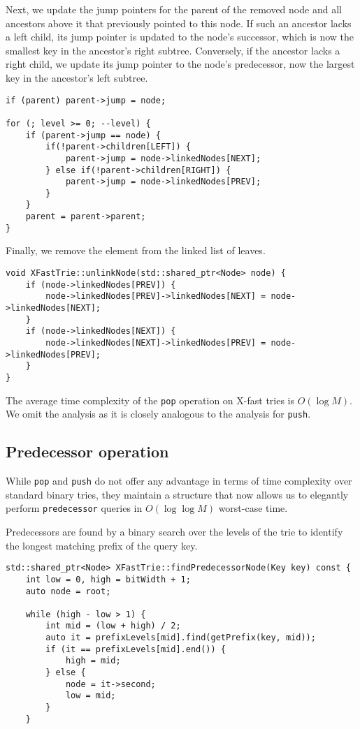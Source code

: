 Next, we update the jump pointers for the parent of the removed node and all ancestors above it that previously pointed to this node. If such an ancestor lacks a left child, its jump pointer is updated to the node’s successor, which is now the smallest key in the ancestor’s right subtree. Conversely, if the ancestor lacks a right child, we update its jump pointer to the node’s predecessor, now the largest key in the ancestor’s left subtree.

\begin{verbatim}
if (parent) parent->jump = node;

for (; level >= 0; --level) {
    if (parent->jump == node) {
        if(!parent->children[LEFT]) {
            parent->jump = node->linkedNodes[NEXT];
        } else if(!parent->children[RIGHT]) {
            parent->jump = node->linkedNodes[PREV];
        }
    }
    parent = parent->parent;
}
\end{verbatim}

Finally, we remove the element from the linked list of leaves.

\begin{verbatim}
void XFastTrie::unlinkNode(std::shared_ptr<Node> node) {
    if (node->linkedNodes[PREV]) {
        node->linkedNodes[PREV]->linkedNodes[NEXT] = node->linkedNodes[NEXT];
    }
    if (node->linkedNodes[NEXT]) {
        node->linkedNodes[NEXT]->linkedNodes[PREV] = node->linkedNodes[PREV];
    }
}
\end{verbatim}

The average time complexity of the \texttt{pop} operation on X-fast tries is \( O(\log M) \). We omit the analysis as it is closely analogous to the analysis for \texttt{push}.

\subsection{Predecessor operation}

While \texttt{pop} and \texttt{push} do not offer any advantage in terms of time complexity over standard binary tries, they maintain a structure that now allows us to elegantly perform \texttt{predecessor} queries in \( O(\log \log M) \) worst-case time.

Predecessors are found by a binary search over the levels of the trie to identify the longest matching prefix of the query key.

\begin{verbatim}
std::shared_ptr<Node> XFastTrie::findPredecessorNode(Key key) const {
    int low = 0, high = bitWidth + 1;
    auto node = root;

    while (high - low > 1) {
        int mid = (low + high) / 2;
        auto it = prefixLevels[mid].find(getPrefix(key, mid));
        if (it == prefixLevels[mid].end()) {
            high = mid;
        } else {
            node = it->second;
            low = mid;
        }
    }
\end{verbatim}

